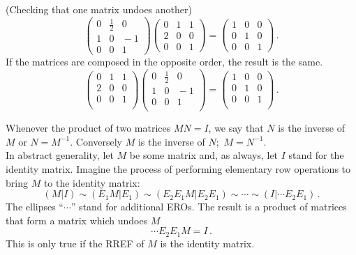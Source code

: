 \begin{example} (Checking that \hypertarget{inversie}{one matrix undoes another})
\[
\left(\begin{array}{rrr}
0&\frac12&0\\
1 &0 &\!\!\!-1\\ 
0  &0 &1
\end{array}  \right)
\left(\begin{array}{ccc}
0&1&1\\
2 &0 &0\\ 
0  &0 &1
\end{array}  \right)
=
\left(\begin{array}{ccc}
1  &0 &0\\
0  &1 &0\\ 
0  &0 &1
\end{array}  \right) \, .
\]
If the matrices are composed in the opposite order, the result is the same.
\[
\left(\begin{array}{ccc}
0&1&1\\
2 &0 &0\\ 
0  &0 &1\\
\end{array}  \right)
\left(\begin{array}{ccr}
0&\frac12&0\\
1 &0 &\!\!\!-1\\ 
0  &0 &1\\
\end{array}  \right)
=
\left(\begin{array}{ccc}
1  &0 &0\\
0  &1 &0\\ 
0  &0 &1\\
\end{array}  \right) \, .
\]
\end{example}


Whenever the product of two matrices $MN=I$, we say that  $N$ is the inverse of $M$ or $N=M^{-1}$. 
Conversely $M$ is the inverse of $N$;~$M=N^{-1}$.\\



In abstract generality, let $M$ be some matrix and, as always, let $I$ stand for the identity matrix. Imagine the process of performing elementary row operations to bring $M$ to the identity matrix: 
\begin{equation*}
(M | I) \sim ( E_1M| E_1)\sim (E_2E_1 M | E_2 E_1) \sim \cdots \sim (I | \cdots E_2E_1 )\, .
\end{equation*}
The ellipses ``$\cdots$'' stand for additional EROs. The result is a product of matrices that form a matrix which undoes $M$
\begin{equation*}
\cdots E_2 E_1 M =  I \, .
\end{equation*}
This is only true if the RREF of $M$ is the identity matrix.  \\

